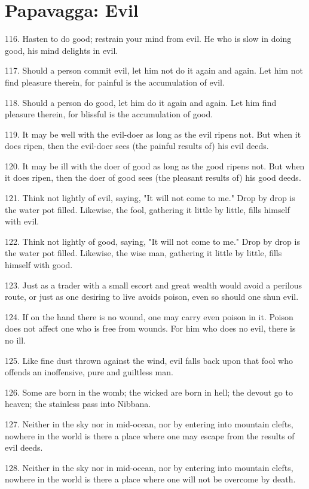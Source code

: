 \newpage
\chapter{Papavagga: Evil}

116. Hasten to do good; restrain your mind from evil. He who is slow in doing good, his mind delights in evil.

117. Should a person commit evil, let him not do it again and again. Let him not find pleasure therein, for painful is the accumulation of evil.

118. Should a person do good, let him do it again and again. Let him find pleasure therein, for blissful is the accumulation of good.

119. It may be well with the evil-doer as long as the evil ripens not. But when it does ripen, then the evil-doer sees (the painful results of) his evil deeds.

120. It may be ill with the doer of good as long as the good ripens not. But when it does ripen, then the doer of good sees (the pleasant results of) his good deeds.

121. Think not lightly of evil, saying, "It will not come to me." Drop by drop is the water pot filled. Likewise, the fool, gathering it little by little, fills himself with evil.

122. Think not lightly of good, saying, "It will not come to me." Drop by drop is the water pot filled. Likewise, the wise man, gathering it little by little, fills himself with good.

123. Just as a trader with a small escort and great wealth would avoid a perilous route, or just as one desiring to live avoids poison, even so should one shun evil.

124. If on the hand there is no wound, one may carry even poison in it. Poison does not affect one who is free from wounds. For him who does no evil, there is no ill.

125. Like fine dust thrown against the wind, evil falls back upon that fool who offends an inoffensive, pure and guiltless man.

126. Some are born in the womb; the wicked are born in hell; the devout go to heaven; the stainless pass into Nibbana.

127. Neither in the sky nor in mid-ocean, nor by entering into mountain clefts, nowhere in the world is there a place where one may escape from the results of evil deeds.

128. Neither in the sky nor in mid-ocean, nor by entering into mountain clefts, nowhere in the world is there a place where one will not be overcome by death.
